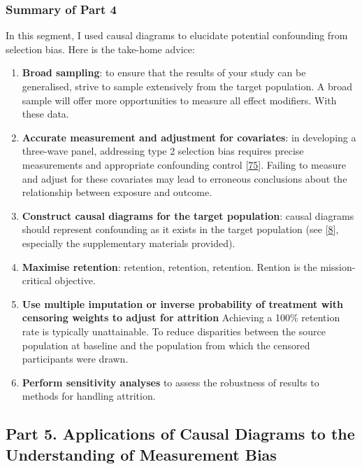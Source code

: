 \documentclass[
  singlecolumn]{article}
\begin{document}
\hypertarget{summary-of-part-4}{%
\subsubsection{Summary of Part 4}\label{summary-of-part-4}}

In this segment, I used causal diagrams to elucidate potential
confounding from selection bias. Here is the take-home advice:

\begin{enumerate}
\def\labelenumi{\arabic{enumi}.}
\item
  \textbf{Broad sampling}: to ensure that the results of your study can
  be generalised, strive to sample extensively from the target
  population. A broad sample will offer more opportunities to measure
  all effect modifiers. With these data.
\item
  \textbf{Accurate measurement and adjustment for covariates}: in
  developing a three-wave panel, addressing type 2 selection bias
  requires precise measurements and appropriate confounding control
  {[}\protect\hyperlink{ref-lu2022}{75}{]}. Failing to measure and
  adjust for these covariates may lead to erroneous conclusions about
  the relationship between exposure and outcome.
\item
  \textbf{Construct causal diagrams for the target population}: causal
  diagrams should represent confounding as it exists in the target
  population (see {[}\protect\hyperlink{ref-suzuki2020}{8}{]},
  especially the supplementary materials provided).
\item
  \textbf{Maximise retention}: retention, retention, retention. Rention
  is the mission-critical objective.
\item
  \textbf{Use multiple imputation or inverse probability of treatment
  with censoring weights to adjust for attrition} Achieving a 100\%
  retention rate is typically unattainable. To reduce disparities
  between the source population at baseline and the population from
  which the censored participants were drawn.
\item
  \textbf{Perform sensitivity analyses} to assess the robustness of
  results to methods for handling attrition.
\end{enumerate}

\hypertarget{part-5.-applications-of-causal-diagrams-to-the-understanding-of-measurement-bias}{%
\subsection{Part 5. Applications of Causal Diagrams to the Understanding
of Measurement
Bias}\label{part-5.-applications-of-causal-diagrams-to-the-understanding-of-measurement-bias}}
\end{document}
